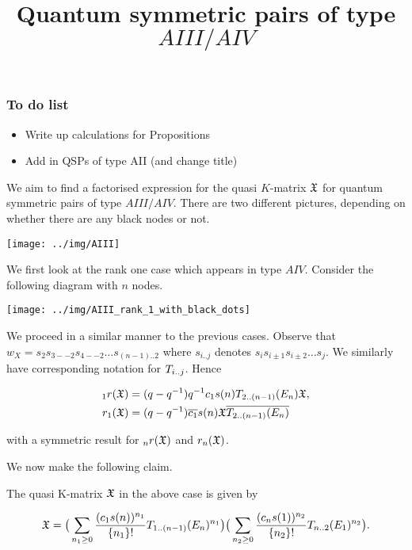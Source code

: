 \documentclass[a4 paper, 10pt]{article}
\begin{document}
\title{Quantum symmetric pairs of type $AIII/AIV$}
\maketitle


\subsubsection*{To do list}
\begin{itemize}
\item Write up calculations for Propositions
\item Add in QSPs of type AII (and change title)

\end{itemize}

We aim to find a factorised expression for the quasi $K$-matrix $\mathfrak{X}$ for quantum symmetric pairs of type $AIII/AIV$. There are two different pictures, depending on whether there are any black nodes or not.


\begin{center}
\texttt{[image: ../img/AIII]}
\end{center}

\noindent We first look at the rank one case which appears in type $AIV$. Consider the following diagram with $n$ nodes.

\begin{center}
\texttt{[image: ../img/AIII\_rank\_1\_with\_black\_dots]}
%
\end{center}


\noindent We proceed in a similar manner to the previous cases. Observe that $w_X = s_2s_{3--2}s_{4--2} \dots s_{(n-1)..2}$ where $s_{i..j}$ denotes $s_is_{i \pm 1}s_{i \pm 2} \dots s_j$. We similarly have corresponding notation for $T_{i..j}$. Hence

\begin{align}
	{}_{1}r(\mathfrak{X}) &= ( q - q^{-1} ) q^{-1}c_1s(n)T_{2..(n-1)}(E_n)\mathfrak{X}, \\
	r_{1}(\mathfrak{X}) &= ( q - q^{-1} ) \overline{c_1}s(n) \mathfrak{X}  \overline{T_{2..(n-1)}(E_n)} 
\end{align} 

\noindent with a symmetric result for ${}_{n}r(\mathfrak{X})$ and $r_{n}(\mathfrak{X})$.

We now make the following claim.

\begin{proposition} \label{Qkmrk1}
The quasi K-matrix $\mathfrak{X}$ in the above case is given by 

	\begin{equation} \label{eq: Qkm_AIII_rank1}
		\mathfrak{X} = \big( \sum_{n_1 \geq 0} \dfrac{ (c_1s(n))^{n_1} }{ \{ n_1 \}! } T_{1..(n-1)}(E_n)^{n_1} \big) \big( \sum_{n_2 \geq 0 } \dfrac{ (c_ns(1))^{n_2} }{ \{ n_2 \}! } T_{n..2}(E_1)^{n_2} \big).
	\end{equation}
\end{proposition}
\end{document}
